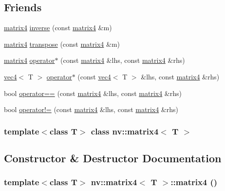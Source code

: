 \subsection*{Friends}
\begin{CompactItemize}
\item 
\hyperlink{classnv_1_1matrix4}{matrix4} \hyperlink{classnv_1_1matrix4_1e4721509d63057ed4e2169224806d03}{inverse} (const \hyperlink{classnv_1_1matrix4}{matrix4} \&m)
\item 
\hyperlink{classnv_1_1matrix4}{matrix4} \hyperlink{classnv_1_1matrix4_59542e7a4af1f5b0e0b3ca8a381c53b7}{transpose} (const \hyperlink{classnv_1_1matrix4}{matrix4} \&m)
\item 
\hyperlink{classnv_1_1matrix4}{matrix4} \hyperlink{classnv_1_1matrix4_32377c4db13e6aaa2cfc16258f4877fd}{operator$\ast$} (const \hyperlink{classnv_1_1matrix4}{matrix4} \&lhs, const \hyperlink{classnv_1_1matrix4}{matrix4} \&rhs)
\item 
\hyperlink{classnv_1_1vec4}{vec4}$<$ T $>$ \hyperlink{classnv_1_1matrix4_861c761d9fd0e866b4d7419ce63d70ce}{operator$\ast$} (const \hyperlink{classnv_1_1vec4}{vec4}$<$ T $>$ \&lhs, const \hyperlink{classnv_1_1matrix4}{matrix4} \&rhs)
\item 
bool \hyperlink{classnv_1_1matrix4_6f106a51a850395024d96e987e5ca5bc}{operator==} (const \hyperlink{classnv_1_1matrix4}{matrix4} \&lhs, const \hyperlink{classnv_1_1matrix4}{matrix4} \&rhs)
\item 
bool \hyperlink{classnv_1_1matrix4_6944f94e4a6431fcaa921dc7422395a0}{operator!=} (const \hyperlink{classnv_1_1matrix4}{matrix4} \&lhs, const \hyperlink{classnv_1_1matrix4}{matrix4} \&rhs)
\end{CompactItemize}
\subsubsection*{template$<$class T$>$ class nv::matrix4$<$ T $>$}



\subsection{Constructor \& Destructor Documentation}
\hypertarget{classnv_1_1matrix4_36fc89111f3d5ad9e46945d4d0bd5921}{
\subsubsection[{matrix4}]{\setlength{\rightskip}{0pt plus 5cm}template$<$class T$>$ {\bf nv::matrix4}$<$ T $>$::{\bf matrix4} ()}}
\label{classnv_1_1matrix4_36fc89111f3d5ad9e46945d4d0bd5921}


